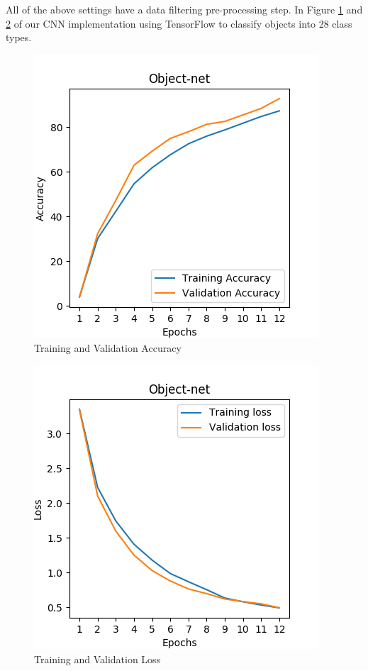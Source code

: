 All of the above settings have a data filtering pre-processing step. In Figure \ref{fig:accuracy} and \ref{fig:loss} of our CNN implementation using TensorFlow to classify objects into 28 class types. 


\begin{figure}[htp]
\begin{center}
        \includegraphics[scale=0.5]{images/accuracy.png}
        \caption{Training and Validation Accuracy}
        \label{fig:accuracy}
\end{center}
\end{figure}



\begin{figure}[htp]
\begin{center}
        \includegraphics[scale=0.5]{images/loss.png}
        \caption{Training and Validation Loss}
        \label{fig:loss}
\end{center}
\end{figure}

